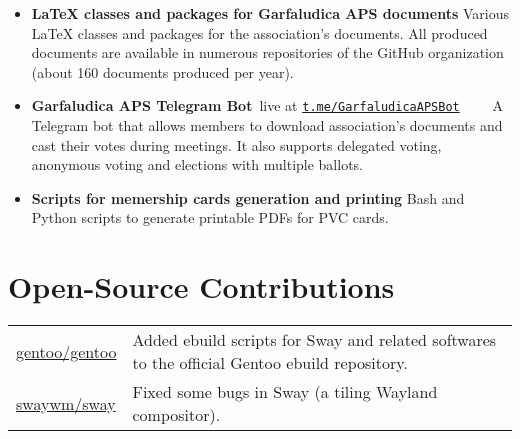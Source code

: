\begin{itemize}
	\item \textbf{\LaTeX{} classes and packages for Garfaludica APS documents}\hfill{}\newline
		{\color{black!70}\footnotesize Various \LaTeX{} classes and
		packages for the association's documents. All produced
		documents are available in numerous repositories of the GitHub
		organization (about 160 documents produced per
		year).}\vspace{0.125cm}\newline
		\skill*{\LaTeX}
	\item \textbf{Garfaludica APS Telegram Bot}\hfill{\color{black!70}\faGlobe~{\footnotesize live at}
		\href{https://t.me/GarfaludicaAPSbot}{\texttt{t.me/GarfaludicaAPSBot}}}~~~~\privatetag\newline
		{\color{black!70}\footnotesize A Telegram bot that allows
		members to download association's documents and cast their
		votes during meetings. It also supports delegated voting,
		anonymous voting and elections with multiple
		ballots.}\vspace{0.125cm}\newline
	\item \textbf{Scripts for memership cards generation and printing}\hfill\privatetag\newline
		{\color{black!70}\footnotesize Bash and Python scripts to
		generate printable PDFs for PVC cards.}\vspace{0.125cm}\newline
		\skill{\LaTeX}
\end{itemize}

\section*{Open-Source Contributions}

\begin{tabular}{>{\ttfamily\footnotesize\arraybackslash}p{}
	>{\footnotesize\arraybackslash}p{}}
	\href{https://github.com/gentoo/gentoo}{gentoo/gentoo} &
	\textcolor{black!70}{Added ebuild scripts for Sway and related softwares to
	the official Gentoo ebuild repository.}\\\addlinespace[.5em]
	\href{https://github.com/swaywm/sway}{swaywm/sway} &
	\textcolor{black!70}{Fixed some bugs in Sway (a tiling Wayland
	compositor).}
\end{tabular}

